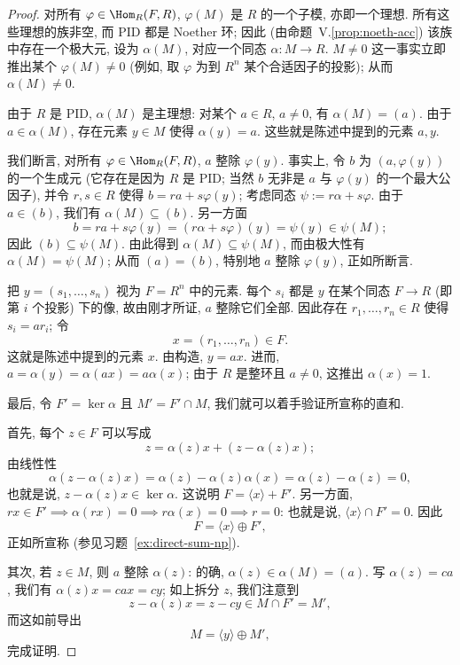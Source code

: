 \begin{proof}
对所有 $\varphi\in\Hom_R(F,R)$, $\varphi(M)$ 是 $R$ 的一个子模, 亦即一个理想. 所有这些理想的族非空, 而 PID 都是 Noether 环; 因此 (由命题~V.\ref{prop:noeth-acc}) 该族中存在一个极大元, 设为 $\alpha(M)$, 对应一个同态 $\alpha:M\to R$. $M\neq 0$ 这一事实立即推出某个 $\varphi(M)\neq 0$ (例如, 取 $\varphi$ 为到 $R^n$ 某个合适因子的投影); 从而 $\alpha(M)\neq 0$.

由于 $R$ 是 PID, $\alpha(M)$ 是主理想: 对某个 $a\in R$, $a\neq 0$, 有 $\alpha(M)=(a)$. 由于 $a\in\alpha(M)$, 存在元素 $y\in M$ 使得 $\alpha(y)=a$. 这些就是陈述中提到的元素 $a,y$.

我们断言, 对所有 $\varphi\in\Hom_R(F,R)$, $a$ 整除 $\varphi(y)$. 事实上, 令 $b$ 为 $(a,\varphi(y))$ 的一个生成元 (它存在是因为 $R$ 是 PID; 当然 $b$ 无非是 $a$ 与 $\varphi(y)$ 的一个最大公因子), 并令 $r,s\in R$ 使得 $b=ra+s\varphi(y)$; 考虑同态 $\psi:=r\alpha+s\varphi$. 由于 $a\in(b)$, 我们有 $\alpha(M)\subseteq(b)$. 另一方面
$$
b=ra+s\varphi(y)=(r\alpha+s\varphi)(y)=\psi(y)\in\psi(M);
$$
因此 $(b)\subseteq\psi(M)$. 由此得到 $\alpha(M)\subseteq\psi(M)$, 而由极大性有 $\alpha(M)=\psi(M)$; 从而 $(a)=(b)$, 特别地 $a$ 整除 $\varphi(y)$, 正如所断言.

把 $y=(s_1,\ldots,s_n)$ 视为 $F=R^n$ 中的元素. 每个 $s_i$ 都是 $y$ 在某个同态 $F\to R$ (即第 $i$ 个投影) 下的像, 故由刚才所证, $a$ 整除它们全部. 因此存在 $r_1,\ldots,r_n\in R$ 使得 $s_i=ar_i$; 令
$$
x=(r_1,\dots,r_n)\in F.
$$
这就是陈述中提到的元素 $x$. 由构造, $y=ax$. 进而, $a=\alpha(y)=\alpha(ax)=a\alpha(x)$; 由于 $R$ 是整环且 $a\neq 0$, 这推出 $\alpha(x)=1$.

最后, 令 $F'=\ker\alpha$ 且 $M'=F'\cap M$, 我们就可以着手验证所宣称的直和.

首先, 每个 $z\in F$ 可以写成
$$
z=\alpha(z)x+(z-\alpha(z)x);
$$
由线性性
$$
\alpha(z-\alpha(z)x)=\alpha(z)-\alpha(z)\alpha(x)=\alpha(z)-\alpha(z)=0,
$$
也就是说, $z-\alpha(z)x\in\ker\alpha$. 这说明 $F=\langle x\rangle+F'$. 另一方面, $rx\in F'\implies \alpha(rx)=0\implies r\alpha(x)=0\implies r=0$: 也就是说, $\langle x\rangle\cap F'=0$. 因此
$$
F=\langle x\rangle\oplus F',
$$
正如所宣称 (参见习题~\ref{ex:direct-sum-np}).

其次, 若 $z\in M$, 则 $a$ 整除 $\alpha(z)$: 的确, $\alpha(z)\in\alpha(M)=(a)$. 写 $\alpha(z)=ca$, 我们有 $\alpha(z)x=cax=cy$; 如上拆分 $z$, 我们注意到
$$
z-\alpha(z)x=z-cy\in M\cap F'=M',
$$
而这如前导出
$$
M=\langle y\rangle\oplus M',
$$
完成证明.
\end{proof}

